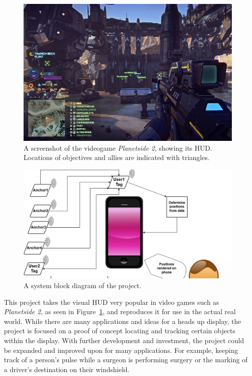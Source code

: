 \begin{figure}
	\centering
	\includegraphics[width=\linewidth]{Figures/GameHUD.jpg}
	\decoRule
	\caption{A screenshot of the videogame \emph{Planetside 2}, showing its HUD. Locations of objectives and allies are indicated with triangles.}
	\label{fig:GameHUD}
\end{figure}

\begin{figure}
	\centering
	\includegraphics[width=\linewidth]{Figures/ARBlockDiagram.png}
	\decoRule
	\caption{A system block diagram of the project.}
	\label{fig:SystemBlockDiagram}
\end{figure}

This project takes the visual HUD very popular in video games such as \emph{Planetside 2}, as seen in Figure~\ref{fig:GameHUD}, and reproduces it for use in the actual real world.  While there are many applications and ideas for a heads up display, the project is focused on a proof of concept locating and tracking certain objects within the display. With further development and investment, the project could be expanded and improved upon for many applications. For example, keeping track of a person’s pulse while a surgeon is performing surgery or the marking of a driver's destination on their windshield.

